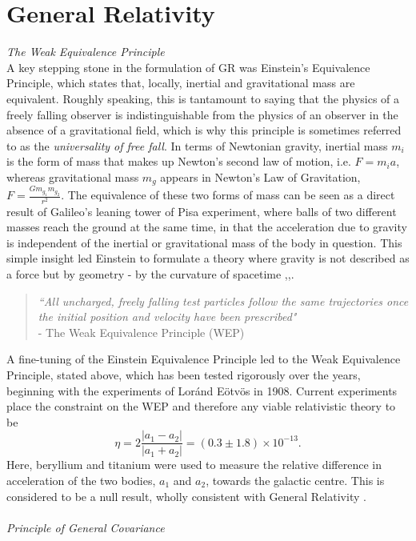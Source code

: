 \section{General Relativity}
\label{sec:GRintro}
\emph{The Weak Equivalence Principle}\\
A key stepping stone in the formulation of GR was Einstein's Equivalence Principle, which states that, locally, inertial and gravitational mass are equivalent. Roughly speaking, this is tantamount to saying that the physics of a freely falling observer is indistinguishable from the physics of an observer in the absence of a gravitational field, which is why this principle is sometimes referred to as the \emph{universality of free fall}. In terms of Newtonian gravity, inertial mass $m_i$ is the form of mass that makes up Newton's second law of motion, i.e. $F=m_{i} a$, whereas gravitational mass $m_g$ appears in Newton's Law of Gravitation, $F=\frac{G m_{g_1}m_{g_2}}{r^2}$. The equivalence of these two forms of mass can be seen as a direct result of Galileo's leaning tower of Pisa experiment, where balls of two different masses reach the ground at the same time, in that the acceleration due to gravity is independent of the inertial or gravitational mass of the body in question. This simple insight led Einstein to formulate a theory where gravity is not described as a force but by geometry - by the curvature of spacetime \cite{Carroll:2004st},\cite{Wald:GR},\cite{Blau}.
\begin{quote}
\emph{``All uncharged, freely falling test particles follow the same trajectories once the initial position and velocity have been prescribed"} \cite{Clifton:2011jh} \\- The Weak Equivalence Principle (WEP)
\end{quote}
A fine-tuning of the Einstein Equivalence Principle led to the Weak Equivalence Principle, stated above, which has been tested rigorously over the years, beginning with the experiments of Lor{\'a}nd E{\"o}tv{\"o}s in 1908. Current experiments place the constraint on the WEP and therefore any viable relativistic theory to be
\[
\eta=2\frac{|a_1-a_2|}{|a_1+a_2|}=(0.3\pm 1.8)\times 10^{-13}
.\]
Here, beryllium and titanium were used to measure the relative difference in acceleration of the two bodies, $a_1$ and $a_2$, towards the galactic centre. This is considered to be a null result, wholly consistent with General Relativity \cite{Clifton:2011jh}.
\\\\\emph{Principle of General Covariance}\\
